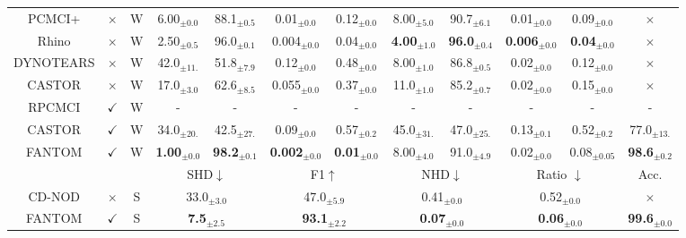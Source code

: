 \begin{table}[H]
{\begin{tabular}{@{}ccc|cccccccc|c@{}}
PCMCI+ & $\times$& W  & 6.00$_{\pm0.0}$     & 88.1$_{\pm0.5}$   & 0.01$_{\pm0.0}$ & 0.12$_{\pm0.0}$ & 8.00$_{\pm5.0}$     & 90.7$_{\pm6.1}$   & 0.01$_{\pm0.0}$ & 0.09$_{\pm0.0}$ & $\times$ \\
    Rhino & $\times$& W  &  2.50$_{\pm0.5}$     & 96.0$_{\pm0.1}$   & 0.004$_{\pm0.0}$ & 0.04$_{\pm0.0}$ & \textbf{4.00}$_{\pm1.0}$     & \textbf{96.0}$_{\pm0.4}$   & \textbf{0.006}$_{\pm0.0}$ & \textbf{0.04}$_{\pm0.0}$ & $\times$ \\
    DYNOTEARS & $\times$& W  &  42.0$_{\pm11.}$   & 51.8$_{\pm7.9}$   & 0.12$_{\pm0.0}$ & 0.48$_{\pm0.0}$  & 8.00$_{\pm1.0}$     & 86.8$_{\pm0.5}$   & 0.02$_{\pm0.0}$ & 0.12$_{\pm0.0}$ & $\times$ \\
    CASTOR & $\times$& W  &  17.0$_{\pm3.0}$    & 62.6$_{\pm8.5}$   & 0.055$_{\pm0.0}$ & 0.37$_{\pm0.0}$ & 11.0$_{\pm1.0}$    & 85.2$_{\pm0.7}$   & 0.02$_{\pm0.0}$ & 0.15$_{\pm0.0}$  & $\times$ \\
    \midrule
    RPCMCI & $\checkmark$& W  &  - & - & - & - & - & - & - & - & - \\
    CASTOR & $\checkmark$& W  &  34.0$_{\pm20.}$   & 42.5$_{\pm27.}$  & 0.09$_{\pm0.0}$ & 0.57$_{\pm0.2}$  & 45.0$_{\pm31.}$   & 47.0$_{\pm25.}$  & 0.13$_{\pm0.1}$ & 0.52$_{\pm0.2}$  & 77.0$_{\pm13.}$ \\
    \rowcolor{gray!20} FANTOM & $\checkmark$& W   & \textbf{1.00}$_{\pm0.0}$& \textbf{98.2}$_{\pm0.1}$ & \textbf{0.002}$_{\pm0.0}$ & \textbf{0.01}$_{\pm0.0}$ &  8.00$_{\pm4.0}$     & 91.0$_{\pm4.9}$   & 0.02$_{\pm0.0}$ & 0.08$_{\pm0.05}$  & \textbf{98.6}$_{\pm0.2}$  \\
    \midrule
      &   &  &\multicolumn{2}{c}{SHD$\downarrow$ } &\multicolumn{2}{c}{F1$\uparrow$} & \multicolumn{2}{c}{NHD$\downarrow$} & \multicolumn{2}{c|}{Ratio $\downarrow$ } & Acc.\\
    \midrule
    CD-NOD & $\times$ & S & \multicolumn{2}{c}{33.0$_{\pm3.0}$} &\multicolumn{2}{c}{47.0$_{\pm5.9}$} & \multicolumn{2}{c}{0.41$_{\pm0.0}$} & \multicolumn{2}{c|}{0.52$_{\pm0.0}$} & $\times$ \\
    \rowcolor{gray!20} FANTOM & $\checkmark$ & S & \multicolumn{2}{c}{\textbf{7.5}$_{\pm2.5}$} &\multicolumn{2}{c}{\textbf{93.1}$_{\pm2.2}$} & \multicolumn{2}{c}{\textbf{0.07}$_{\pm0.0}$} & \multicolumn{2}{c|}{\textbf{0.06}$_{\pm0.0}$} & \textbf{99.6}$_{\pm0.0}$  \\ \bottomrule
\end{tabular}}
\end{table}

